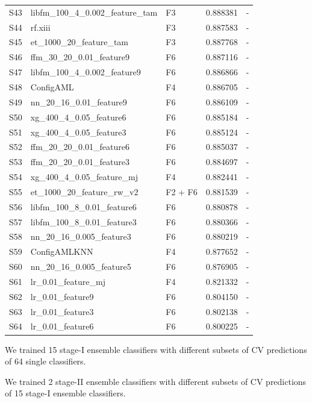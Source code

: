 \begin{table}[t]
\begin{center}
\begin{tabular}{lllll}
S43	& libfm\_100\_4\_0.002\_feature\_tam	& F3				& 0.888381	& - \\
S44	& rf.xiii				& F3							& 0.887583	& - \\
S45	& et\_1000\_20\_feature\_tam	& F3						& 0.887768	& - \\
S46 	& ffm\_30\_20\_0.01\_feature9	& F6						& 0.887116	& - \\
S47	& libfm\_100\_4\_0.002\_feature9	& F6					& 0.886866	& - \\
S48	& ConfigAML			& F4							& 0.886705	& - \\
S49	& nn\_20\_16\_0.01\_feature9	& F6						& 0.886109	& - \\
S50 	& xg\_400\_4\_0.05\_feature6	& F6						& 0.885184	& - \\
S51 	& xg\_400\_4\_0.05\_feature3	& F6						& 0.885124	& - \\
S52 	& ffm\_20\_20\_0.01\_feature6	& F6						& 0.885037	& - \\
S53	& ffm\_20\_20\_0.01\_feature3	& F6						& 0.884697	& - \\
S54 	& xg\_400\_4\_0.05\_feature\_mj	& F4					& 0.882441	& - \\
S55	& et\_1000\_20\_feature\_rw\_v2	& F2 + F6				& 0.881539	& - \\
S56	& libfm\_100\_8\_0.01\_feature6	& F6					& 0.880878	& - \\
S57	& libfm\_100\_8\_0.01\_feature3	& F6					& 0.880366	& - \\
S58	& nn\_20\_16\_0.005\_feature3	& F6						& 0.880219	& - \\
S59	& ConfigAMLKNN		& F4							& 0.877652	& - \\
S60	& nn\_20\_16\_0.005\_feature5	& F6						& 0.876905	& - \\
S61	& lr\_0.01\_feature\_mj		& F4						& 0.821332	& - \\
S62	& lr\_0.01\_feature9		& F6							& 0.804150	& - \\
S63	& lr\_0.01\_feature3		& F6							& 0.802138	& - \\
S64	& lr\_0.01\_feature6		& F6							& 0.800225	& - \\
\end{tabular}
\end{center}
\end{table}

We trained 15 stage-I ensemble classifiers with different subsets of CV predictions of 64 single classifiers.

We trained 2 stage-II ensemble classifiers with different subsets of CV predictions of 15 stage-I ensemble classifiers.

